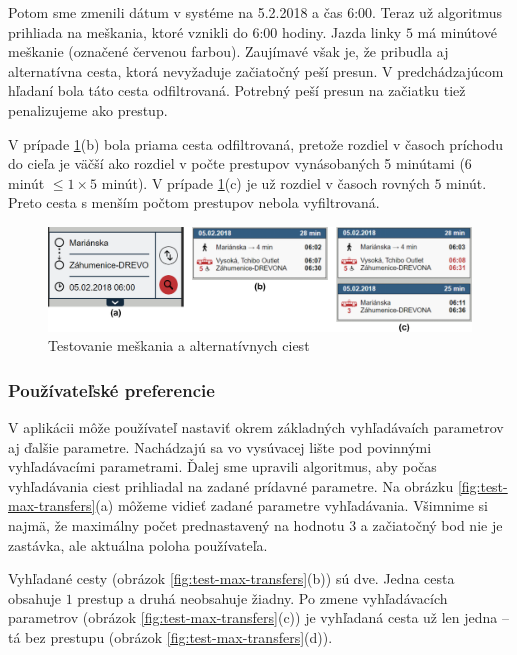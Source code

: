 Potom sme zmenili dátum v systéme na 5.2.2018 a čas 6:00. Teraz už algoritmus prihliada na meškania, ktoré vznikli do 6:00 hodiny. Jazda linky $5$ má minútové meškanie (označené červenou farbou). Zaujímavé však je, že pribudla aj alternatívna cesta, ktorá nevyžaduje začiatočný peší presun. V predchádzajúcom hľadaní bola táto cesta odfiltrovaná. Potrebný peší presun na začiatku tiež penalizujeme ako prestup. 
 
V prípade \ref{fig:test-delay-alternative}(b) bola priama cesta odfiltrovaná, pretože rozdiel v časoch príchodu do cieľa je väčší ako rozdiel v počte prestupov vynásobaných 5 minútami ($6$ minút $\leq 1\times5$ minút).
V prípade \ref{fig:test-delay-alternative}(c) je už rozdiel v časoch rovných $5$ minút. Preto cesta s menším počtom prestupov nebola vyfiltrovaná.

\begin{figure}[H]
\centerline{\includegraphics[width=1.0\textwidth]{images/test/delay-alternative}}
\caption[Testovanie meškania a alternatívnych ciest]{Testovanie meškania a alternatívnych ciest}
\label{fig:test-delay-alternative}
\end{figure}

\subsubsection{Používateľské preferencie}

V aplikácii môže používateľ nastaviť okrem základných vyhľadávaích parametrov aj ďalšie parametre. Nachádzajú sa vo vysúvacej lište pod povinnými vyhľadávacími parametrami. Ďalej sme upravili algoritmus, aby počas vyhľadávania ciest prihliadal na zadané prídavné parametre. Na obrázku \ref{fig:test-max-transfers}(a) môžeme vidieť zadané parametre vyhľadávania. Všimnime si najmä, že maximálny počet prednastavený na hodnotu $3$ a začiatočný bod nie je zastávka, ale aktuálna poloha používateľa. 

Vyhľadané cesty (obrázok \ref{fig:test-max-transfers}(b)) sú dve. Jedna cesta obsahuje $1$ prestup a druhá neobsahuje žiadny. Po zmene vyhľadávacích parametrov (obrázok \ref{fig:test-max-transfers}(c)) je vyhľadaná cesta už len jedna – tá bez prestupu (obrázok \ref{fig:test-max-transfers}(d)).

